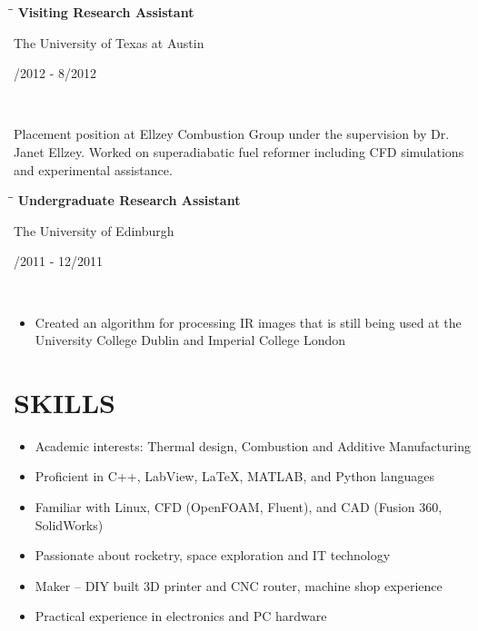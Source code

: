 \documentclass[11pt]{res}
\begin{document}
\begin{resume}
{   \begin{tabbing}%
   \hspace{2.7in}\= \hspace{2.3in}\= \kill %
   {\bf Visiting Research Assistant}  \> \parbox[c]{6cm}{ \centering The University of Texas at Austin } \> \parbox[c]{3.8cm}{ /2012 - 8/2012}\\
   \end{tabbing}\vspace{-30pt}
	Placement position at Ellzey Combustion Group under the supervision by Dr. Janet Ellzey. Worked on superadiabatic fuel reformer including CFD simulations and experimental assistance.
 \vspace{-9pt}
}
   
 \vspace{-18pt}
   \begin{tabbing}
   \hspace{2.7in}\= \hspace{2.3in}\= \kill %
    {\bf Undergraduate Research Assistant} \> \parbox[c]{6cm}{ \centering The University of Edinburgh} \> \parbox[c]{3.8cm}{ /2011 - 12/2011}\\
   \end{tabbing}
   \vspace{-22pt}
   
    \begin{itemize}
   	\setlength{\leftmargin}{-10pt} \setlength\itemsep{0pt}
   	\item Created an algorithm for processing IR images that is still being used at the University College Dublin and Imperial College London
   	\end{itemize}
 \vspace{-10pt}

\vspace{-10pt}           
\section{SKILLS}   
	\begin{itemize}
   	\setlength{\leftmargin}{-10pt} \setlength\itemsep{0pt}
	\item Academic interests: Thermal design, Combustion and Additive Manufacturing
	\item Proficient in C++, LabView, LaTeX, MATLAB, and Python languages
	\item Familiar with Linux, CFD (OpenFOAM, Fluent), and CAD (Fusion 360, SolidWorks)
	\item Passionate about rocketry, space exploration and IT technology
	\item Maker  {}-- DIY built 3D printer and CNC router, machine shop experience
	\item Practical experience in electronics and PC hardware
	\end{itemize}


\end{resume}
\end{document}
